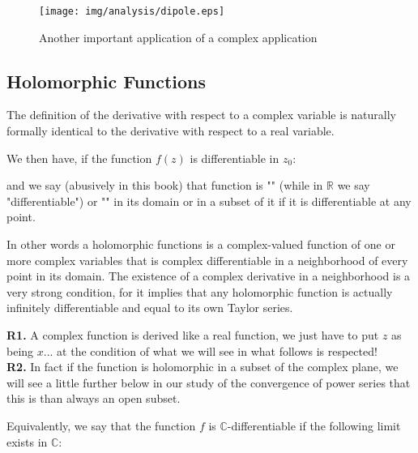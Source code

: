 	\pagebreak
	\begin{tcolorbox}[colframe=black,colback=white,sharp corners]
	\begin{figure}[H]
		\begin{center}
			\texttt{[image: img/analysis/dipole.eps]}
		\end{center}	
		\caption{Another important application of a complex application}
	\end{figure}
	\end{tcolorbox}
	
	\subsection{Holomorphic Functions}\label{holomorphic functions}
	The definition of the derivative with respect to a complex variable is naturally formally identical to the derivative with respect to a real variable.
	
	We then have, if the function $f(z)$ is differentiable in $z_0$:
	
	
	and we say (abusively in this book) that function is "" (while in $\mathbb{R}$ we say "differentiable") or "" in its domain or in a subset of it if it is differentiable at any point.
	
	In other words a holomorphic functions is a complex-valued function of one or more complex variables that is complex differentiable in a neighborhood of every point in its domain. The existence of a complex derivative in a neighborhood is a very strong condition, for it implies that any holomorphic function is actually infinitely differentiable and equal to its own Taylor series.
	
	\begin{tcolorbox}[title=Remarks,colframe=black,arc=10pt]
	\textbf{R1.} A complex function is derived like a real function, we just have to put $z$ as being $x$... at the condition of what we will see in what follows is respected!\\
	
	\textbf{R2.} In fact if the function is holomorphic in a subset of the complex plane, we will see a little further below in our study of the convergence of power series that this is than always an open subset.
	\end{tcolorbox}
	Equivalently, we say that the function $f$ is $\mathbb{C}$-differentiable if the following limit exists in  $\mathbb{C}$:
	
